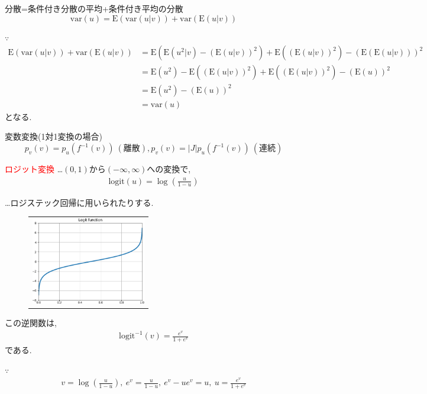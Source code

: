 \documentclass[11pt,a4pape,dvipdfmx]{jarticle}
\newcommand{\eqn}[1]{\begin{align*}#1\end{align*}}
\newcommand{\tcr}[1]{\textcolor{red}{#1}}
\begin{document}
\begin{itembox}[l]{分散=条件付き分散の平均+条件付き平均の分散}
\[\text{var}(u)=\text{E}(\text{var}(u|v))+\text{var}(\text{E}(u|v))\]
\end{itembox}

$\because$
\eqn{\text{E}(\text{var}(u|v))+\text{var}(\text{E}(u|v))
&=\text{E}(\text{E}(u^2|v)-(\text{E}(u|v))^2)+\text{E}((\text{E}(u|v))^2)-(\text{E}(\text{E}(u|v)))^2\\
&=\text{E}(u^2)-\text{E}((\text{E}(u|v))^2)+\text{E}((\text{E}(u|v))^2)-(\text{E}(u))^2\\
&=\text{E}(u^2)-(\text{E}(u))^2\\
&=\text{var}(u)}
となる.


\begin{itembox}[l]{変数変換(1対1変換の場合)}
\[p_v(v)=p_u(f^{-1}(v))\ (\text{離散}), p_v(v)=|J|p_u(f^{-1}(v))\ (\text{連続})\]
\end{itembox}


\begin{itembox}[l]{\tcr{ロジット変換}}
…$(0,1)$から$(-\infty,\infty)$への変換で,
\eqn{\text{logit}(u)=\log \left(\frac{u}{1-u}\right)}
\end{itembox}

…ロジステック回帰に用いられたりする.

\begin{figure}[H]
\begin{center}
\begin{tabular}{c}
\begin{minipage}{0.33\hsize}
\begin{center}
\includegraphics[clip, width=5cm]{../1/code/logit_func.png}
\end{center}
\end{minipage}
\end{tabular}
\end{center}
\end{figure}
この逆関数は,
\eqn{\text{logit}^{-1}(v)=\frac{e^v}{1+e^v}}
である.

$\because$
\eqn{v=\log \left(\frac{u}{1-u}\right),\ e^v=\frac{u}{1-u},\ e^v-ue^v=u,\ u=\frac{e^v}{1+e^v}}
\end{document}
